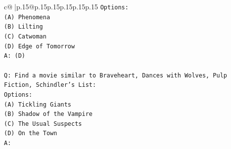 \documentclass{article}
\begin{document}
{\begin{supertabular}{c@{$\;$}|p{.15\linewidth}@{}p{.15\linewidth}p{.15\linewidth}p{.15\linewidth}p{.15\linewidth}p{.15\linewidth}}
{{{\texttt{Options:} \\
\texttt{(A) Phenomena} \\
\texttt{(B) Lilting} \\
\texttt{(C) Catwoman} \\
\texttt{(D) Edge of Tomorrow} \\
\texttt{A: (D)} \\
\\ 
\texttt{Q: Find a movie similar to Braveheart, Dances with Wolves, Pulp Fiction, Schindler's List:} \\
\texttt{Options:} \\
\texttt{(A) Tickling Giants} \\
\texttt{(B) Shadow of the Vampire} \\
\texttt{(C) The Usual Suspects} \\
\texttt{(D) On the Town} \\
\texttt{A:} \\
            }
        }
    }
     \\ \\


\end{supertabular}}
\end{document}
